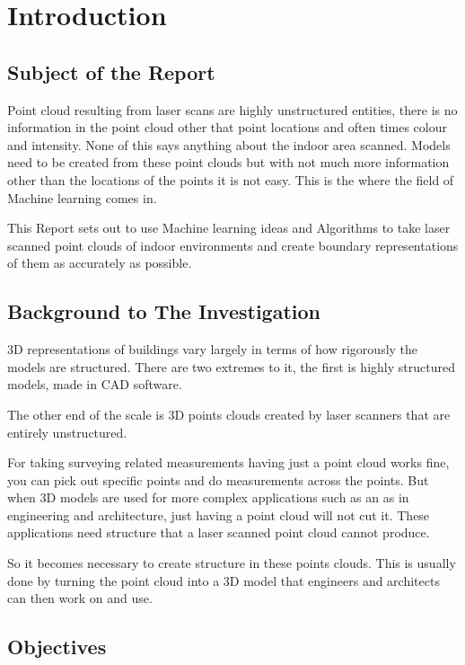 
\chapter{Introduction}
	
	\section{Subject of the Report}
	
		Point cloud resulting from laser scans are highly unstructured entities, there is no information in the point cloud other that point locations and often times colour and intensity. None of this says anything about the indoor area scanned. Models need to be created from these point clouds but with not much more information other than the locations of the points it is not easy. This is the where the field of Machine learning comes in.
		
		This Report sets out to use Machine learning ideas and Algorithms to take laser scanned point clouds of indoor environments and create boundary representations of them as accurately as possible.
	
	\section{Background to The Investigation}
	
		3D representations of buildings vary largely in terms of how rigorously the models are structured. There are two extremes to it, the first is highly structured models, made in CAD software.
		
		The other end of the scale is 3D points clouds created by laser scanners that are entirely unstructured.
		
		For taking surveying related measurements having just a point cloud works fine, you can pick out specific points and do measurements across the points. But when 3D models are used for more complex applications such as an as in engineering and architecture, just having a point cloud will not cut it. These applications need structure that a laser scanned point cloud cannot produce.
		
		So it becomes necessary to create structure in these points clouds. This is usually done by turning the point cloud into a 3D model that engineers and architects can then work on and use.
		
	\section{Objectives}
	
